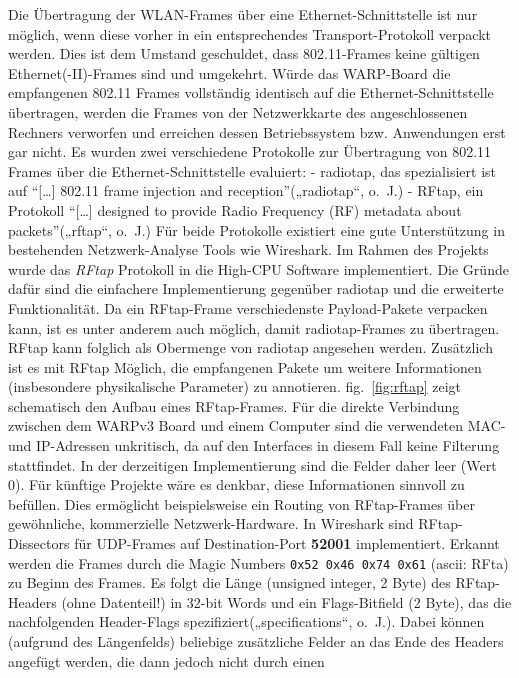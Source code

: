 \documentclass[letterpaper,11pt]{article}
\newcommand{\plusnamesingular}{}
\newcommand{\xrefname}[1]{\protect\renewcommand{\plusnamesingular}{#1}}
\providecommand{\cref}{\plusnamesingular~\ref}
\begin{document}
\begin{onehalfspace}
Die Übertragung der WLAN-Frames über eine Ethernet-Schnittstelle ist nur
möglich, wenn diese vorher in ein entsprechendes Transport-Protokoll
verpackt werden. Dies ist dem Umstand geschuldet, dass 802.11-Frames
keine gültigen Ethernet(-II)-Frames sind und umgekehrt. Würde das
WARP-Board die empfangenen 802.11 Frames vollständig identisch auf die
Ethernet-Schnittstelle übertragen, werden die Frames von der
Netzwerkkarte des angeschlossenen Rechners verworfen und erreichen
dessen Betriebssystem bzw. Anwendungen erst gar nicht.
Es wurden zwei verschiedene Protokolle zur Übertragung von 802.11 Frames
über die Ethernet-Schnittstelle evaluiert: - radiotap, das spezialisiert
ist auf ``{[}\ldots{}{]} 802.11 frame injection and
reception''(„radiotap``, o.~J.) - RFtap, ein Protokoll ``{[}\ldots{}{]}
designed to provide Radio Frequency (RF) metadata about
packets''(„rftap``, o.~J.)
Für beide Protokolle existiert eine gute Unterstützung in bestehenden
Netzwerk-Analyse Tools wie Wireshark. Im Rahmen des Projekts wurde das
\emph{RFtap} Protokoll in die High-CPU Software implementiert. Die
Gründe dafür sind die einfachere Implementierung gegenüber radiotap und
die erweiterte Funktionalität. Da ein RFtap-Frame verschiedenste
Payload-Pakete verpacken kann, ist es unter anderem auch möglich, damit
radiotap-Frames zu übertragen. RFtap kann folglich als Obermenge von
radiotap angesehen werden. Zusätzlich ist es mit RFtap Möglich, die
empfangenen Pakete um weitere Informationen (insbesondere physikalische
Parameter) zu annotieren. \xrefname{fig.}\cref{fig:rftap} zeigt
schematisch den Aufbau eines RFtap-Frames.
Für die direkte Verbindung zwischen dem WARPv3 Board und einem Computer
sind die verwendeten MAC- und IP-Adressen unkritisch, da auf den
Interfaces in diesem Fall keine Filterung stattfindet. In der
derzeitigen Implementierung sind die Felder daher leer (Wert 0). Für
künftige Projekte wäre es denkbar, diese Informationen sinnvoll zu
befüllen. Dies ermöglicht beispielsweise ein Routing von RFtap-Frames
über gewöhnliche, kommerzielle Netzwerk-Hardware.
In Wireshark sind RFtap-Dissectors für UDP-Frames auf Destination-Port
\textbf{52001} implementiert. Erkannt werden die Frames durch die Magic
Numbers \texttt{0x52\ 0x46\ 0x74\ 0x61} (ascii: RFta) zu Beginn des
Frames. Es folgt die Länge (unsigned integer, 2 Byte) des RFtap-Headers
(ohne Datenteil!) in 32-bit Words und ein Flags-Bitfield (2 Byte), das
die nachfolgenden Header-Flags spezifiziert(„specifications``, o.~J.).
Dabei können (aufgrund des Längenfelds) beliebige zusätzliche Felder an
das Ende des Headers angefügt werden, die dann jedoch nicht durch einen

\end{onehalfspace}
\end{document}
